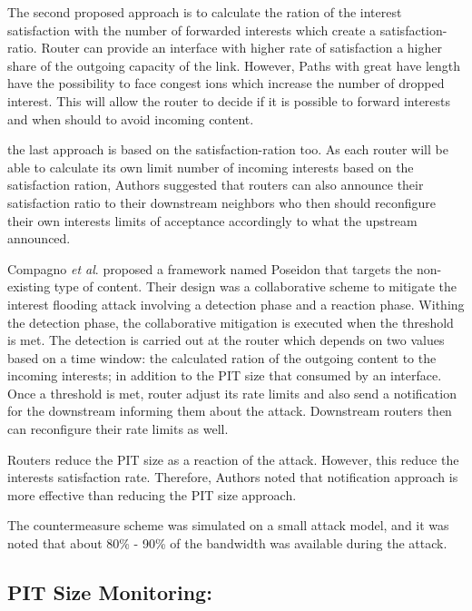 \documentclass[conference]{IEEEtran}
\begin{document}
The second proposed approach is to calculate the ration of the interest satisfaction with the number of forwarded interests which create a satisfaction-ratio. Router can provide an interface with higher rate of satisfaction a higher share of the outgoing capacity of the link. However, Paths with great have length have the possibility to face congest ions which increase the number of dropped interest. This will allow the router to decide if it is possible to forward interests and when should to avoid incoming content. 

the last approach is based on the satisfaction-ration too. As each router will be able to calculate its own limit number of incoming interests based on the satisfaction ration,  Authors suggested that routers can also announce their satisfaction ratio to their downstream neighbors who then should reconfigure their own interests limits of acceptance accordingly to what the upstream announced.     

Compagno \textit{et al}. \cite{Compagno2013} proposed a framework named Poseidon that targets the non-existing type of content. Their design was a collaborative scheme to mitigate the interest flooding attack involving a detection phase and a reaction phase. Withing the detection phase, the collaborative mitigation is executed when the threshold is met. The detection is carried out at the router which depends on two values based on a time window: the calculated ration of the outgoing content to the incoming interests; in addition to the PIT size that consumed by an interface. Once a threshold is met, router adjust its rate limits and also send a notification for the downstream informing them about the attack. Downstream routers then can reconfigure their rate limits as well. 

Routers reduce the PIT size as a reaction of the attack. However, this reduce the interests satisfaction rate. Therefore, Authors noted that notification approach is more effective than reducing the PIT size approach.

The countermeasure scheme was simulated on a small attack model, and it was noted that about 80\% - 90\% of the bandwidth was available during the attack.       





\subsection{PIT Size Monitoring:}
\end{document}
